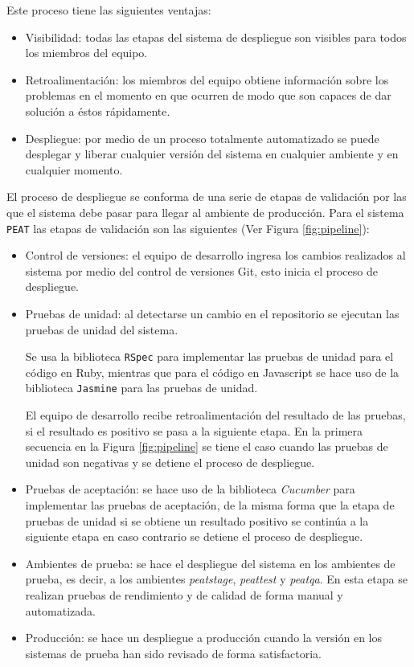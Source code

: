 Este proceso tiene las siguientes ventajas:
\begin{itemize}
\item Visibilidad: todas las etapas del sistema de despliegue son visibles
  para todos los miembros del equipo.
\item Retroalimentación: los miembros del equipo obtiene información sobre los
  problemas en el momento en que ocurren de modo que son capaces de dar solución
  a éstos rápidamente.
\item Despliegue: por medio de un proceso totalmente automatizado se puede
  desplegar y liberar cualquier versión del sistema en cualquier ambiente y en
  cualquier momento.
\end{itemize}

El proceso de despliegue se conforma de una serie de etapas de validación por las
que el sistema debe pasar para llegar al ambiente de producción. Para el sistema
\texttt{PEAT} las etapas de validación son las siguientes (Ver Figura
\ref{fig:pipeline}):
\begin{itemize}
\item Control de versiones: el equipo de desarrollo ingresa los cambios
  realizados al sistema por medio del control de versiones Git, esto inicia
  el proceso de despliegue.
\item Pruebas de unidad: al detectarse un cambio en el repositorio se ejecutan las
  pruebas de unidad del sistema.

  Se usa la biblioteca \texttt{RSpec} para implementar las pruebas de unidad
  para el código en Ruby, mientras que para el código en Javascript se hace uso de
  la biblioteca \texttt{Jasmine} para las pruebas de unidad.

  El equipo de desarrollo recibe retroalimentación del resultado de las pruebas,
  si el resultado es positivo se pasa a la siguiente etapa.
  En la primera secuencia en la Figura \ref{fig:pipeline} se tiene el caso
  cuando las pruebas de unidad son negativas y se detiene el proceso de despliegue.
\item Pruebas de aceptación: se hace uso de la biblioteca \textit{Cucumber}
  para implementar las pruebas de aceptación, de la misma forma que la etapa de
  pruebas de unidad si se obtiene un resultado positivo se continúa a la siguiente
  etapa en caso contrario se detiene el proceso de despliegue.
\item Ambientes de prueba: se hace el despliegue del sistema en los ambientes de
  prueba, es decir, a los ambientes \textit{peatstage}, \textit{peattest} y
  \textit{peatqa}. En esta etapa se realizan pruebas de rendimiento y de calidad
  de forma manual y automatizada.
\item Producción: se hace un despliegue a producción cuando la versión en los
  sistemas de prueba han sido revisado de forma satisfactoria.
\end{itemize}

